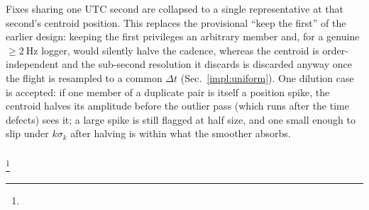Fixes sharing one UTC second are
collapsed to a single representative at that second's centroid position. This replaces the
provisional \enquote{keep the first} of the earlier design: keeping the first privileges an
arbitrary member and, for a genuine $\ge\!\SI{2}{\hertz}$ logger, would silently halve the
cadence, whereas the centroid is order-independent and the sub-second resolution it discards
is discarded anyway once the flight is resampled to a common $\Delta t$
(Sec.~\ref{impl:uniform}). One dilution case is accepted: if one member of a duplicate pair
is itself a position spike, the centroid halves its amplitude before the outlier pass (which
runs after the time defects) sees it; a large spike is still flagged at half size, and one
small enough to slip under $k\sigma_k$ after halving is within what the smoother absorbs.

\subsubsection{}
\footnote{}


